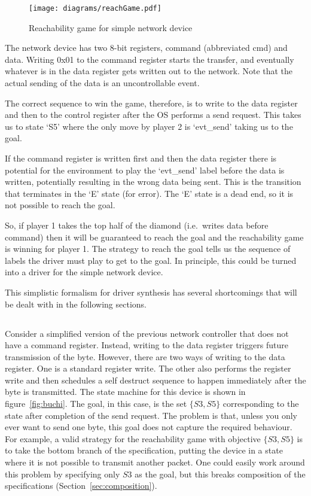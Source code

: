 \begin{figure}
\centering
\texttt{[image: diagrams/reachGame.pdf]}
\caption{Reachability game for simple network device}
\label{fig:reach}
\end{figure}

The network device has two 8-bit registers, command (abbreviated cmd) and data. Writing 0x01 to the command register starts the transfer, and eventually whatever is in the data register gets written out to the network. Note that the actual sending of the data is an uncontrollable event. 

The correct sequence to win the game, therefore, is to write to the data register and then to the control register after the OS performs a send request. This takes us to state `S5' where the only move by player 2 is `evt\_send' taking us to the goal. 

If the command register is written first and then the data register there is potential for the environment to play the `evt\_send' label before the data is written, potentially resulting in the wrong data being sent. This is the transition that terminates in the `E' state (for error). The `E' state is a dead end, so it is not possible to reach the goal. 

So, if player 1 takes the top half of the diamond (i.e.\ writes data before command) then it will be guaranteed to reach the goal and the reachability game is winning for player 1. The strategy to reach the goal tells us the sequence of labels the driver must play to get to the goal. In principle, this could be turned into a driver for the simple network device.

This simplistic formalism for driver synthesis has several shortcomings that will be dealt with in the following sections.

\subsection{\buchi}

Consider a simplified version of the previous network controller that does not have a command register. Instead, writing to the data register triggers future transmission of the byte. However, there are two ways of writing to the data register. One is a standard register write. The other also performs the register write and then schedules a self destruct sequence to happen immediately after the byte is transmitted. The state machine for this device is shown in figure~\ref{fig:buchi}. The goal, in this case, is the set $\{S3, S5\}$ corresponding to the state after completion of the send request. The problem is that, unless you only ever want to send one byte, this goal does not capture the required behaviour. For example, a valid strategy for the reachability game with objective $\{S3, S5\}$ is to take the bottom branch of the specification, putting the device in a state where it is not possible to transmit another packet. One could easily work around this problem by specifying only ${S3}$ as the goal, but this breaks composition of the specifications (Section~\ref{sec:composition}).

